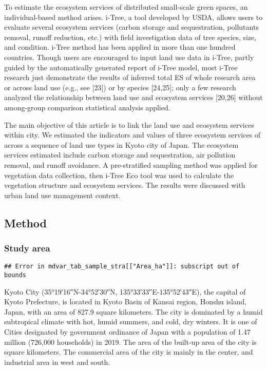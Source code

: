 \documentclass[
]{article}
\begin{document}
To estimate the ecosystem services of distributed small-scale green spaces, an individual-based method arises.
i-Tree, a tool developed by USDA, allows users to evaluate several ecosystem services (carbon storage and sequestration, pollutants removal, runoff reduction, etc.) with field investigation data of tree species, size, and condition.
i-Tree method has been applied in more than one hundred countries.
Though users are encouraged to input land use data in i-Tree, partly guided by the automatically generated report of i-Tree model, most i-Tree research just demonstrate the results of inferred total ES of whole research area or across land use (e.g., see {[}23{]}) or by species {[}24,25{]}; only a few research analyzed the relationship between land use and ecosystem services {[}20,26{]} without among-group comparison statistical analysis applied.

The main objective of this article is to link the land use and ecosystem services within city. We estimated the indicators and values of three ecosystem services of across a sequence of land use types in Kyoto city of Japan. The ecosystem services estimated include carbon storage and sequestration, air pollution removal, and runoff avoidance. A pre-stratified sampling method was applied for vegetation data collection, then i-Tree Eco tool was used to calculate the vegetation structure and ecosystem services. The results were discussed with urban land use management context.

\hypertarget{method}{%
\subsection{Method}\label{method}}

\hypertarget{study-area}{%
\subsubsection{Study area}\label{study-area}}

\begin{verbatim}
## Error in mdvar_tab_sample_stra[["Area_ha"]]: subscript out of bounds
\end{verbatim}

Kyoto City (35°19′16″N-34°52′30″N, 135°33′33″E-135°52′43″E), the capital of Kyoto Prefecture, is located in Kyoto Basin of Kansai region, Honshu island, Japan, with an area of 827.9 square kilometers.
The city is dominated by a humid subtropical climate with hot, humid summers, and cold, dry winters.
It is one of Cities designated by government ordinance of Japan with a population of 1.47 million (726,000 households) in 2019. The area of the built-up area of the city is
square kilometers. The commercial area of the city is mainly in the center, and industrial area in west and south.
\end{document}
